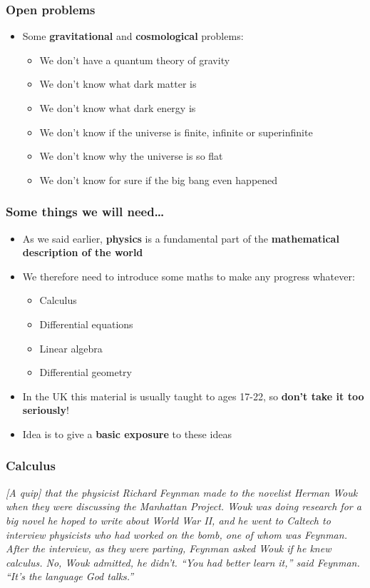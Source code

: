 \documentclass{beamer}
\begin{document}
\begin{frame}
  \frametitle{Open problems}
  \begin{itemize}
    \item<1-> Some \textbf{gravitational} and \textbf{cosmological} problems:
      \begin{itemize}
	\item<2-> We don't have a quantum theory of gravity
	\item<3-> We don't know what dark matter is
	\item<4-> We don't know what dark energy is
	\item<5-> We don't know if the universe is finite, infinite or superinfinite
	\item<6-> We don't know why the universe is so flat 
	\item<7-> We don't know for sure if the big bang even happened
      \end{itemize}
  \end{itemize}
\end{frame}

\begin{frame}
  \frametitle{Some things we will need\ldots}
  \begin{itemize}
    \item<1-> As we said earlier, \textbf{physics} is a fundamental part of the \textbf{mathematical description of the world}
    \item<2-> We therefore need to introduce some maths to make any progress whatever:
      \begin{itemize}
	\item<3-> Calculus
	\item<4-> Differential equations
	\item<5-> Linear algebra
	\item<6-> Differential geometry 
      \end{itemize}
    \item<7-> In the UK this material is usually taught to ages 17-22, so \textbf{don't take it too seriously}!
    \item<8-> Idea is to give a \textbf{basic exposure} to these ideas
  \end{itemize}
\end{frame}

\begin{frame}
  \frametitle{Calculus}
  \textit{[A quip] that the physicist Richard Feynman made to the novelist Herman Wouk when they were discussing the Manhattan Project. Wouk was doing research for a big novel he hoped to write about World War II, and he went to Caltech to interview physicists who had worked on the bomb, one of whom was Feynman. After the interview, as they were parting, Feynman asked Wouk if he knew calculus. No, Wouk admitted, he didn’t. “You had better learn it,” said Feynman. “It’s the language God talks.”}
\end{frame}
\end{document}
